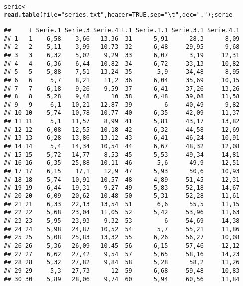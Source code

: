 \documentclass{article}\usepackage[]{graphicx}\usepackage[]{color}
\makeatletter
\newcommand{\hlnum}[1]{\textcolor[rgb]{0.686,0.059,0.569}{#1}}%
\newcommand{\hlstr}[1]{\textcolor[rgb]{0.192,0.494,0.8}{#1}}%
\newcommand{\hlstd}[1]{\textcolor[rgb]{0.345,0.345,0.345}{#1}}%
\newcommand{\hlkwb}[1]{\textcolor[rgb]{0.69,0.353,0.396}{#1}}%
\newcommand{\hlkwc}[1]{\textcolor[rgb]{0.333,0.667,0.333}{#1}}%
\newcommand{\hlkwd}[1]{\textcolor[rgb]{0.737,0.353,0.396}{\textbf{#1}}}%
\newenvironment{kframe}{%
 \def\at@end@of@kframe{}%
 \ifinner\ifhmode%
  \def\at@end@of@kframe{\end{minipage}}%
  \begin{minipage}{\columnwidth}%
 \fi\fi%
 \def\FrameCommand##1{\hskip\@totalleftmargin \hskip-\fboxsep
 \colorbox{shadecolor}{##1}\hskip-\fboxsep
     \hskip-\linewidth \hskip-\@totalleftmargin \hskip\columnwidth}%
 \MakeFramed {\advance\hsize-\width
   \@totalleftmargin\z@ \linewidth\hsize
   \@setminipage}}%
 {\par\unskip\endMakeFramed%
 \at@end@of@kframe}
\newenvironment{knitrout}{}{} %
\makeatother
\begin{document}
\\
\begin{knitrout}
\color{fgcolor}\begin{kframe}
\begin{alltt}
\hlstd{serie} \hlkwb{<-} \hlkwd{read.table}\hlstd{(}\hlkwc{file} \hlstd{=} \hlstr{"series.txt"}\hlstd{,} \hlkwc{header} \hlstd{=} \hlnum{TRUE}\hlstd{,}\hlkwc{sep} \hlstd{=} \hlstr{"\textbackslash{}t"}\hlstd{,} \hlkwc{dec} \hlstd{=} \hlstr{"."}\hlstd{);serie}
\end{alltt}
\begin{verbatim}
##     t Serie.1 Serie.3 Serie.4 t.1 Serie.1.1 Serie.3.1 Serie.4.1
## 1   1    6,58    3,66   13,36  31      5,91      28,3      8,09
## 2   2    5,11    3,99   10,73  32      6,48     29,95      9,68
## 3   3    6,32    5,02    9,29  33      6,07      3,19     12,31
## 4   4    6,36    6,44   10,82  34      6,72     33,13     10,82
## 5   5    5,88    7,51   13,24  35       5,9     34,48      8,95
## 6   6     5,7    8,21    11,2  36      6,04     35,69     10,15
## 7   7    6,18    9,26    9,59  37      6,41     37,26     13,26
## 8   8    5,28    9,48      10  38      6,48     39,08     11,58
## 9   9     6,1   10,21   12,87  39         6     40,49      9,82
## 10 10    5,74   10,78   10,77  40      6,35     42,09     11,37
## 11 11     5,1   11,57    8,99  41      5,81     43,17     13,82
## 12 12    6,08   12,55   10,18  42      6,32     44,58     12,69
## 13 13    6,28   13,86   13,12  43      6,41     46,24     10,91
## 14 14     5,4   14,34   10,54  44      6,67     48,32     12,08
## 15 15    5,72   14,77    8,53  45      5,53     49,34     14,81
## 16 16    6,35   25,88   10,11  46       5,6      49,9     12,51
## 17 17    6,15    17,1    12,9  47      5,93      50,6     10,93
## 18 18    5,74   10,91   10,57  48      4,89     51,45     12,31
## 19 19    6,44   19,31    9,27  49      5,83     52,18     14,67
## 20 20    6,09   20,62   10,48  50      5,31     52,28     11,61
## 21 21    6,33   22,13   13,54  51       6,6      55,5     11,15
## 22 22    5,68   23,04   11,05  52      5,42     53,96     11,63
## 23 23    5,95   23,93    9,32  53         6     54,69     14,38
## 24 24    5,98   24,87   10,52  54       5,7     55,21     11,86
## 25 25    5,08   25,83   13,32  55      6,26     56,27     10,08
## 26 26    5,36   26,09   10,45  56      6,15     57,46     12,12
## 27 27    6,62   27,42    9,54  57      5,65     58,16     14,23
## 28 28    5,32   27,82    9,84  58      5,28      58,2     11,26
## 29 29     5,3   27,73      12  59      6,68     59,48     10,83
## 30 30    5,89   28,06    9,74  60      5,94     60,56     11,84
\end{verbatim}
\end{kframe}
\end{knitrout}
\end{document}
